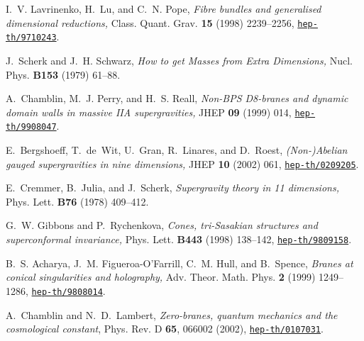 \documentclass[a4paper,12pt]{article}
\begin{document}
\begin{thebibliography}{10}
I.~V. Lavrinenko, H.~Lu, and C.~N. Pope, \emph{Fibre bundles and generalised
  dimensional reductions,} Class. Quant. Grav. {\bf 15} (1998) 2239--2256,
\href{http://arXiv.org/abs/hep-th/9710243}{{\tt hep-th/9710243}}.

J.~Scherk and J.~H. Schwarz, \emph{How to get Masses from Extra Dimensions,}
  Nucl. Phys. {\bf B153} (1979)
61--88.

A.~Chamblin, M.~J. Perry, and H.~S. Reall, \emph{Non-BPS D8-branes and dynamic
  domain walls in massive IIA supergravities,} JHEP {\bf 09} (1999) 014,
\href{http://arXiv.org/abs/hep-th/9908047}{{\tt hep-th/9908047}}.

E.~Bergshoeff, T.~de~Wit, U.~Gran, R.~Linares, and D.~Roest,
  \emph{(Non-)Abelian gauged supergravities in nine dimensions,} JHEP {\bf 10}
  (2002) 061,
\href{http://arXiv.org/abs/hep-th/0209205}{{\tt hep-th/0209205}}.

E.~Cremmer, B.~Julia, and J.~Scherk, \emph{Supergravity theory in 11
  dimensions,} Phys. Lett. {\bf B76} (1978)
409--412.

G.~W. Gibbons and P.~Rychenkova, \emph{Cones, tri-Sasakian structures and
  superconformal invariance,} Phys. Lett. {\bf B443} (1998) 138--142,
\href{http://arXiv.org/abs/hep-th/9809158}{{\tt hep-th/9809158}}.

B.~S. Acharya, J.~M. Figueroa-O'Farrill, C.~M. Hull, and B.~Spence,
  \emph{Branes at conical singularities and holography,} Adv. Theor. Math.
  Phys. {\bf 2} (1999) 1249--1286,
\href{http://arXiv.org/abs/hep-th/9808014}{{\tt hep-th/9808014}}.

A.~Chamblin and N.~D.~Lambert,
\emph{Zero-branes, quantum mechanics and the cosmological constant},
Phys. Rev. D {\bf 65}, 066002 (2002),
\href{http://arXiv.org/abs/hep-th/0107031}{{\tt hep-th/0107031}}.
\end{thebibliography}
\end{document}
